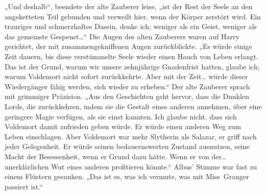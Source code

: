 „Und deshalb“, beendete der alte Zauberer leise, „ist der Rest der Seele an den angeketteten Teil gebunden und verweilt hier, wenn der Körper zerstört wird. Ein trauriges und schmerzhaftes Dasein, denke ich; weniger als ein Geist, weniger als das gemeinste Gespenst…“
Die Augen des alten Zauberers waren auf Harry gerichtet, der mit zusammengekniffenen Augen zurückblickte.
„Es würde einige Zeit dauern, bis diese verstümmelte Seele wieder einen Hauch von Leben erlangt. Das ist der Grund, warum wir unsere zehnjährige Gnadenfrist hatten, glaube ich; warum Voldemort nicht sofort zurückkehrte. Aber mit der Zeit… würde dieser Wiedergänger fähig werden, sich wieder zu erheben.“
Der alte Zauberer sprach mit grimmiger Präzision.
„Aus den Geschichten geht hervor, dass die Dunklen Lords, die zurückkehren, indem sie die Gestalt eines anderen annehmen, über eine geringere Magie verfügen, als sie einst kannten. Ich glaube nicht, dass sich Voldemort damit zufrieden geben würde. Er würde einen anderen Weg zum Leben einschlagen. Aber Voldemort war mehr Slytherin als Salazar, er griff nach jeder Gelegenheit. Er würde seinen bedauernswerten Zustand ausnutzen, seine Macht der Besessenheit, wenn er Grund dazu hätte. Wenn er von der…unerklärlichen Wut eines anderen profitieren könnte.“ Albus' Stimme war fast zu einem Flüstern gesunken.
„Das ist es, was ich vermute, was mit Miss~Granger passiert ist.“


